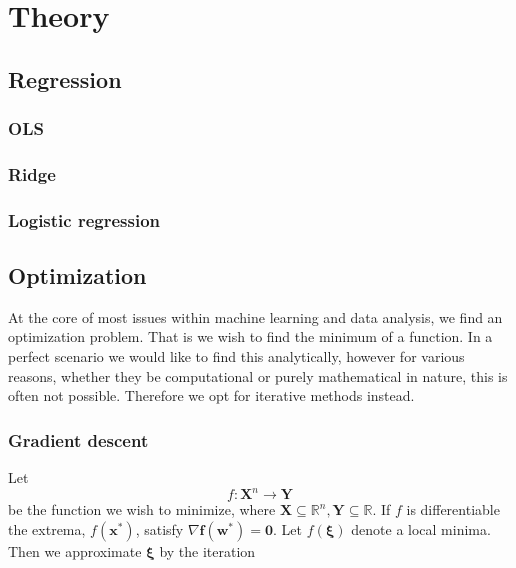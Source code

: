 \documentclass{article}
\begin{document}
\newpage

\section{Theory}
\subsection{Regression}

\subsubsection{OLS}

\subsubsection{Ridge}

\subsubsection{Logistic regression}


\subsection{Optimization}

At the core of most issues within machine learning and data analysis, we find an optimization problem. That is we wish to find the minimum of a function. In a perfect scenario we would like to find this analytically, however for various reasons, whether they be computational or purely mathematical in nature, this is often not possible. Therefore we opt for iterative methods instead.
\subsubsection{Gradient descent}

Let  $$f: \mathbf{X}^n \rightarrow \mathbf{Y}$$ be the function we wish to minimize, where $ \mathbf{X} \subseteq \mathbb{R}^n, \mathbf{Y}\subseteq \mathbb{R}$. If $f$ is differentiable the extrema, $f(\mathbf{x^*})$, satisfy $\nabla \mathbf{f(w^*)} = \mathbf{0}$. Let $f(\mathbf{\xi})$ denote a local minima. Then we approximate $\mathbf{\xi}$ by the iteration
\end{document}
